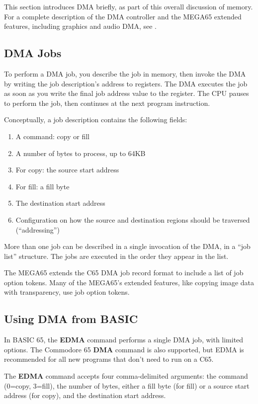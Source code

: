 This section introduces DMA briefly, as part of this overall discussion of memory. For a complete description of the DMA controller and the MEGA65 extended features, including graphics and audio DMA, see .

\subsection{DMA Jobs}

To perform a DMA job, you describe the job in memory, then invoke the DMA by writing the job description's address to registers. The DMA executes the job as soon as you write the final job address value to the register. The CPU pauses to perform the job, then continues at the next program instruction.

Conceptually, a job description contains the following fields:

\begin{enumerate}
\item A command: copy or fill
\item A number of bytes to process, up to 64KB
\item For copy: the source start address
\item For fill: a fill byte
\item The destination start address
\item Configuration on how the source and destination regions should be traversed (``addressing'')
\end{enumerate}

More than one job can be described in a single invocation of the DMA, in a ``job list'' structure. The jobs are executed in the order they appear in the list.

The MEGA65 extends the C65 DMA job record format to include a list of job option tokens. Many of the MEGA65's extended features, like copying image data with transparency, use job option tokens.

\subsection{Using DMA from BASIC}

In BASIC 65, the {\bf EDMA} command performs a single DMA job, with limited options. The Commodore 65 {\bf DMA} command is also supported, but EDMA is recommended for all new programs that don't need to run on a C65.

The \textbf{EDMA} command accepts four comma-delimited arguments: the command (0=copy, 3=fill), the number of bytes, either a fill byte (for fill) or a source start address (for copy), and the destination start address.

